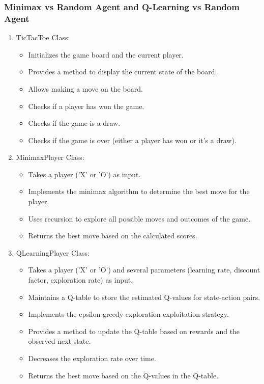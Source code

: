 \documentclass{article}
\begin{document}
\subsubsection{Minimax vs Random Agent and  Q-Learning vs Random Agent}
\begin{enumerate}
  \item TicTacToe Class:
    \begin{itemize}
      \item Initializes the game board and the current player.
      \item Provides a method to display the current state of the board.
      \item Allows making a move on the board.
      \item Checks if a player has won the game.
      \item Checks if the game is a draw.
      \item Checks if the game is over (either a player has won or it's a draw).
    \end{itemize}

  \item MinimaxPlayer Class:
    \begin{itemize}
      \item Takes a player ('X' or 'O') as input.
      \item Implements the minimax algorithm to determine the best move for the player.
      \item Uses recursion to explore all possible moves and outcomes of the game.
      \item Returns the best move based on the calculated scores.
    \end{itemize}

  \item QLearningPlayer Class:
    \begin{itemize}
      \item Takes a player ('X' or 'O') and several parameters (learning rate, discount factor, exploration rate) as input.
      \item Maintains a Q-table to store the estimated Q-values for state-action pairs.
      \item Implements the epsilon-greedy exploration-exploitation strategy.
      \item Provides a method to update the Q-table based on rewards and the observed next state.
      \item Decreases the exploration rate over time.
      \item Returns the best move based on the Q-values in the Q-table.
    \end{itemize}


\end{enumerate}
\end{document}
